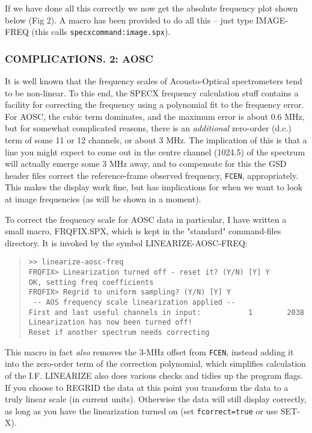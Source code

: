 \documentclass[twoside,11pt]{article}
\renewcommand{\_}{\texttt{\symbol{95}}}
\newenvironment{myquote}{\begin{quote}\begin{small}}{\end{small}\end{quote}}
\begin{document}
If we have done all this correctly we now get the absolute frequency plot
shown below (Fig 2). A macro has been provided to do all this -- just type
IMAGE-FREQ (this calls \texttt{specx\_command:image.spx}).

\subsubsection{COMPLICATIONS. 2: AOSC}

It is well known that the frequency scales of Acousto-Optical spectrometers
tend to be non-linear. To this end, the SPECX frequency calculation stuff
contains a facility for correcting the frequency using a polynomial fit to the
frequency error. For AOSC, the cubic term dominates, and the maximum error is
about 0.6 MHz, but for somewhat complicated reasons, there is an
\emph{additional} zero-order (d.c.) term of some 11 or 12 channels, or about 3
MHz. The implication of this is that a line you might expect to come out in
the centre channel (1024.5) of the spectrum will actually emerge some 3 MHz
away, and to compensate for this the GSD header files correct the
reference-frame observed frequency, \texttt{F\_CEN}, appropriately. This makes
the display work fine, but has implications for when we want to look at image
frequencies (as will be shown in a moment).

To correct the frequency scale for AOSC data in particular, I have written a
small macro, FRQFIX.SPX, which is kept in the "standard" command-files
directory. It is invoked by the symbol LINEARIZE-AOSC-FREQ:
\begin{myquote}
\begin{verbatim}
>> linearize-aosc-freq
FRQFIX> Linearization turned off - reset it? (Y/N) [Y] Y
OK, setting freq coefficients
FRQFIX> Regrid to uniform sampling? (Y/N) [Y] Y
 -- AOS frequency scale linearization applied --
First and last useful channels in input:           1        2038
Linearization has now been turned off!
Reset if another spectrum needs correcting
\end{verbatim}
\end{myquote}

This macro in fact \emph{also} removes the 3-MHz offset from \texttt{F\_CEN},
instead adding it into the zero-order term of the correction polynomial, which
simplifies calculation of the I.F. LINEARIZE also does various checks and
tidies up the program flags. If you choose to REGRID the data at this point
you transform the data to a truly linear scale (in current units). Otherwise
the data will still display correctly, as long as you have the linearization
turned on (set \texttt{fcorrect=true} or use SET-X).
\end{document}
